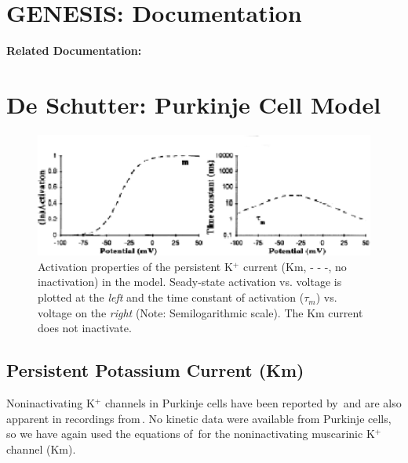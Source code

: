 \documentclass[12pt]{article}
\begin{document}
\section*{GENESIS: Documentation}

{\bf Related Documentation:}

\section*{De Schutter: Purkinje Cell Model}

\begin{figure}[h]
\centering
   \includegraphics[scale=0.75]{figures/DS1.2E2.eps}
   \caption{Activation properties of the persistent K$^+$ current (Km, - - -, no inactivation) in the model. Seady-state activation vs. voltage is plotted at the {\em left} and the time constant of activation ($\tau_m$) vs. voltage on the {\em right} (Note: Semilogarithmic scale). The Km current does not inactivate.}
   \label{fig:DS1.2E2}
\end{figure}

\subsection*{Persistent Potassium Current (Km)}

Noninactivating K$^+$ channels in Purkinje cells have been reported by\,\cite{Bossu:1989kl} and are also apparent in recordings from\,\cite{Hirano:1989uq}. No kinetic data were available from Purkinje cells, so we have again used the equations of\,\cite{Yamada-W:1989bs} for the noninactivating muscarinic K$^+$ channel (Km).



\end{document}
